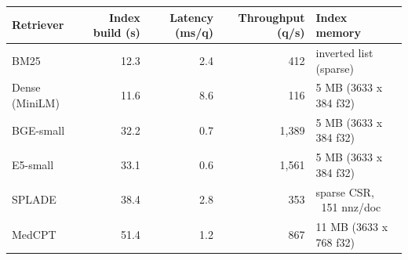\begin{tabular}{lrrrl}
\toprule
\textbf{Retriever} & \textbf{Index build (s)} & \textbf{Latency (ms/q)} & \textbf{Throughput (q/s)} & \textbf{Index memory} \\
\midrule
BM25 & 12.3 & 2.4 & 412 & inverted list (sparse) \\
Dense (MiniLM) & 11.6 & 8.6 & 116 & 5 MB (3633 x 384 f32) \\
BGE-small & 32.2 & 0.7 & 1,389 & 5 MB (3633 x 384 f32) \\
E5-small & 33.1 & 0.6 & 1,561 & 5 MB (3633 x 384 f32) \\
SPLADE & 38.4 & 2.8 & 353 & sparse CSR, ~151 nnz/doc \\
MedCPT & 51.4 & 1.2 & 867 & 11 MB (3633 x 768 f32) \\
\bottomrule
\end{tabular}
